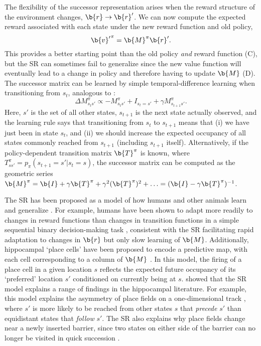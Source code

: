 The flexibility of the successor representation arises when the reward structure of the environment changes, $\b{r} \rightarrow \b{r}'$.
We can now compute the expected reward associated with each state under the new reward function and old policy,
\begin{equation}
    {\b{v}'}^\pi = \b{M}^\pi \b{r}'.
\end{equation}
This provides a better starting point than the old policy \emph{and} reward function (C), but the SR can sometimes fail to generalize since the new value function will eventually lead to a change in policy and therefore having to update $\b{M}$ (D).
The successor matrix can be learned by simple temporal-difference learning when transitioning from $s_t$, analogous to :
\begin{equation}
    \Delta M^\pi_{s_t s'} \propto -M^\pi_{s_t s'} + I_{s_t = s'} + \gamma M^\pi_{s_{t+1} s'}.
\end{equation}
Here, ${s'}$ is the set of all other states, $s_{t+1}$ is the next state actually observed, and the learning rule says that transitioning from $s_t$ to $s_{t+1}$ means that (i) we have just been in state $s_t$, and (ii) we should increase the expected occupancy of all states commonly reached from $s_{t+1}$ (including $s_{t+1}$ itself).
Alternatively, if the policy-dependent transition matrix $\b{T}^\pi$ is known, where $T^\pi_{s s'} = p_{\pi}(s_{t+1} = s' | s_t = s)$, the successor matrix can be computed as the geometric series $\b{M}^\pi = \b{I} + \gamma \b{T}^\pi + \gamma^2 (\b{T}^\pi)^2 + \ldots = (\b{I} - \gamma \b{T}^\pi)^{-1}$.

The SR has been proposed as a model of how humans and other animals learn and generalize \citep{momennejad2017successor, stachenfeld2017hippocampus, geerts2020general,gershman2018successor}.
For example, humans have been shown to adapt more readily to changes in reward functions than changes in transition functions in a simple sequential binary decision-making task \citep{momennejad2017successor}, consistent with the SR facilitating rapid adaptation to changes in $\b{r}$ but only slow learning of $\b{M}$.
Additionally, hippocampal `place cells' have been proposed to encode a predictive map, with each cell corresponding to a column of $\b{M}$ \citep{stachenfeld2017hippocampus}.
In this model, the firing of a place cell in a given location $s$ reflects the expected future occupancy of its `preferred' location $s'$ conditioned on currently being at $s$.
\citet{stachenfeld2017hippocampus} showed that the SR model explains a range of findings in the hippocampal literature.
For example, this model explains the asymmetry of place fields on a one-dimensional track \citep{mehta2000experience}, where $s'$ is more likely to be reached from other states $s$ that \emph{precede} $s'$ than equidistant states that \emph{follow} $s'$.
The SR also explains why place fields change near a newly inserted barrier, since two states on either side of the barrier can no longer be visited in quick succession \citep{alvernhe2011local}.

